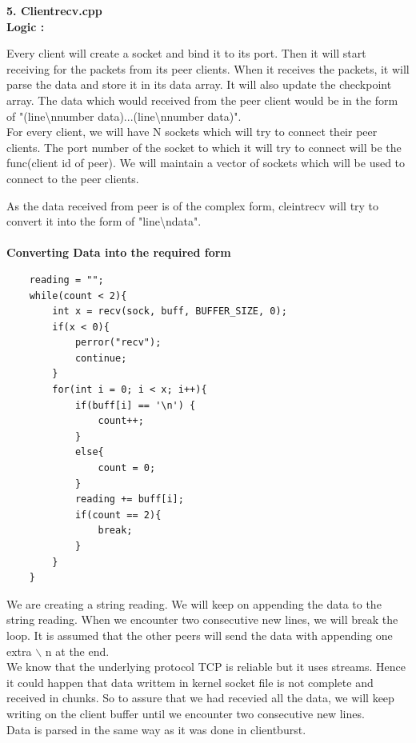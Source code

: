 \documentclass[12pt]{scrartcl}
\begin{document}
\textbf{5. Clientrecv.cpp}\\
\textbf{Logic : }
\par Every client will create a socket and bind it to its port. Then it will start receiving for the packets from its peer clients. When it receives the packets, it will parse the data and store it in its data array. It will also update the checkpoint array. The data which would received from the peer client would be in the form of "(line\textbackslash nnumber data)...(line\textbackslash nnumber data)".\\ For every client, we will have N sockets which will try to connect their peer clients. The port number of the socket to which it will try to connect will be the func(client id of peer). We will maintain a vector of sockets which will be used to connect to the peer clients.\\
\par As the data received from peer is of the complex form, cleintrecv will try to convert it into the form of "line\textbackslash ndata".\\\\
\textbf{Converting Data into the required form}
\begin{verbatim}
    reading = "";
    while(count < 2){
        int x = recv(sock, buff, BUFFER_SIZE, 0);
        if(x < 0){
            perror("recv");
            continue;
        }
        for(int i = 0; i < x; i++){
            if(buff[i] == '\n') {
                count++;
            }
            else{
                count = 0;
            }
            reading += buff[i];
            if(count == 2){
                break;
            }
        }
    }
\end{verbatim}
\par We are creating a string reading. We will keep on appending the data to the string reading. When we encounter two consecutive new lines, we will break the loop. It is assumed that the other peers will send the data with appending one extra $\backslash$ n at the end.\\
We know that the underlying protocol TCP is reliable but it uses streams. Hence it could happen that data writtem in kernel socket file is not complete and received in chunks. So to assure that we had recevied all the data, we will keep writing on the client buffer until we encounter two consecutive new lines.\\
Data is parsed in the same way as it was done in clientburst.\\
\end{document}
